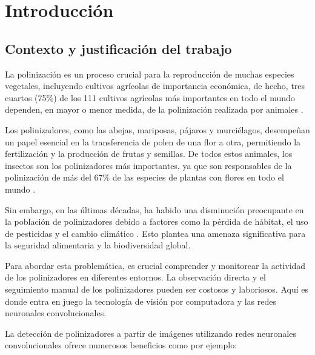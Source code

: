 \chapter{Introducción}
\label{chapter:introduccion}


\section{Contexto y justificación del trabajo}

La polinización es un proceso crucial para la reproducción de muchas especies vegetales, incluyendo cultivos agrícolas de importancia económica, de hecho, tres cuartos (75\%) de los 111 cultivos agrícolas más importantes en todo el mundo dependen, en mayor o menor medida, de la polinización realizada por animales \cite{klein-2006}. 

Los polinizadores, como las abejas, mariposas, pájaros y murciélagos, desempeñan un papel esencial en la transferencia de polen de una flor a otra, permitiendo la fertilización y la producción de frutas y semillas. De todos estos animales, los insectos son los polinizadores más importantes, ya que son responsables de la polinización de más del 67\% de las especies de plantas con flores en todo el mundo \cite{innovatione-agrofood-design-2021}.

Sin embargo, en las últimas décadas, ha habido una disminución preocupante en la población de polinizadores debido a factores como la pérdida de hábitat, el uso de pesticidas y el cambio climático \cite{unam-2019}. Esto plantea una amenaza significativa para la seguridad alimentaria y la biodiversidad global.

Para abordar esta problemática, es crucial comprender y monitorear la actividad de los polinizadores en diferentes entornos. La observación directa y el seguimiento manual de los polinizadores pueden ser costosos y laboriosos. Aquí es donde entra en juego la tecnología de visión por computadora y las redes neuronales convolucionales.

La detección de polinizadores a partir de imágenes utilizando redes neuronales convolucionales ofrece numerosos beneficios como por ejemplo:

